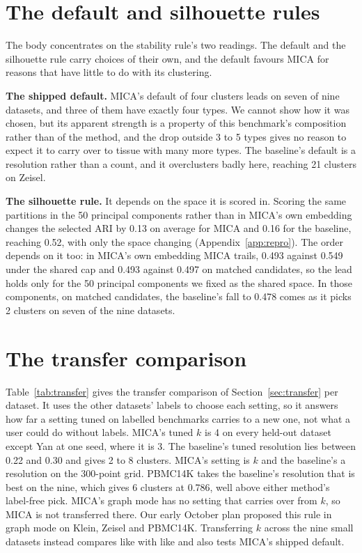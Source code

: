 

\section{The default and silhouette rules}\label{app:secondary}
The body concentrates on the stability rule's two readings. The default and the silhouette rule
carry choices of their own, and the default favours MICA for reasons that have little to do with
its clustering.

\textbf{The shipped default.}
MICA's default of four clusters leads on seven of nine datasets, and three of them have exactly
four types. We cannot show how it was chosen, but its apparent strength is a property of this
benchmark's composition rather than of the method, and the drop outside 3 to 5 types gives no reason
to expect it to carry over to tissue with many more types. The baseline's default is a resolution
rather than a count, and it overclusters badly here, reaching 21 clusters on Zeisel.

\textbf{The silhouette rule.} It depends on the space it is scored in. Scoring the same partitions in the 50
principal components rather than in MICA's own embedding changes the selected ARI by 0.13
on average for MICA and 0.16 for the baseline, reaching 0.52, with only the space changing
(Appendix~\ref{app:repro}). The order depends on it too: in MICA's own embedding MICA trails, 0.493
against 0.549 under the shared cap and 0.493 against 0.497 on matched candidates, so the lead
holds only for the 50 principal components we fixed as the shared space. In those components, on
matched candidates, the baseline's fall to 0.478 comes as it picks 2 clusters on seven of the nine
datasets.

\section{The transfer comparison}\label{app:transfer}
Table~\ref{tab:transfer} gives the transfer comparison of Section~\ref{sec:transfer} per
dataset. It uses the other datasets' labels to choose each setting, so it answers how far a
setting tuned on labelled benchmarks carries to a new one, not what a user could do without
labels. MICA's tuned $k$ is 4 on every held-out dataset except Yan at one seed, where it is 3.
The baseline's tuned resolution lies between 0.22 and 0.30 and gives 2 to 8 clusters. MICA's setting
is $k$ and the baseline's a resolution on the 300-point grid. PBMC14K takes the baseline's resolution
that is best on the nine, which gives 6 clusters at 0.786, well above either method's label-free pick. MICA's
graph mode has no setting that carries over from $k$, so MICA is not transferred there. Our early October plan proposed this rule in graph mode on Klein, Zeisel and PBMC14K.
Transferring $k$ across the nine small datasets instead compares like with like and also tests MICA's
shipped default.

